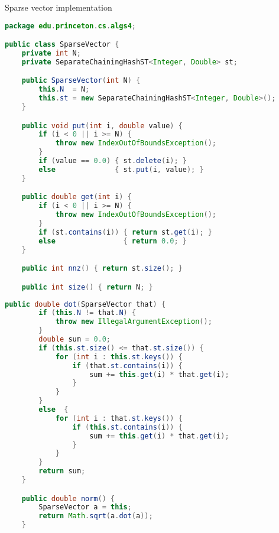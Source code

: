\documentclass[8pt,a4paper,compress]{beamer}
\begin{document}
\begin{frame}[fragile]
\pause

Sparse vector implementation
\begin{lstlisting}[language=java,style=focusin]
package edu.princeton.cs.algs4;

public class SparseVector {
    private int N; 
    private SeparateChainingHashST<Integer, Double> st; 

    public SparseVector(int N) {
        this.N  = N;
        this.st = new SeparateChainingHashST<Integer, Double>();
    }

    public void put(int i, double value) {
        if (i < 0 || i >= N) {
            throw new IndexOutOfBoundsException();
        }
        if (value == 0.0) { st.delete(i); }
        else              { st.put(i, value); }
    }

    public double get(int i) {
        if (i < 0 || i >= N) { 
            throw new IndexOutOfBoundsException();
        }
        if (st.contains(i)) { return st.get(i); }
        else                { return 0.0; }
    }

    public int nnz() { return st.size(); }

    public int size() { return N; }
\end{lstlisting}
\end{frame}

\begin{frame}[fragile]
\pause

\begin{lstlisting}[language=java,style=focusin]
    public double dot(SparseVector that) {
        if (this.N != that.N) {
            throw new IllegalArgumentException();
        }
        double sum = 0.0;
        if (this.st.size() <= that.st.size()) {
            for (int i : this.st.keys()) {
                if (that.st.contains(i)) { 
                    sum += this.get(i) * that.get(i); 
                }
            }
        }
        else  {
            for (int i : that.st.keys()) {
                if (this.st.contains(i)) {
                    sum += this.get(i) * that.get(i);
                }
            }
        }
        return sum;
    }

    public double norm() {
        SparseVector a = this;
        return Math.sqrt(a.dot(a));
    }
\end{lstlisting}
\end{frame}
\end{document}
